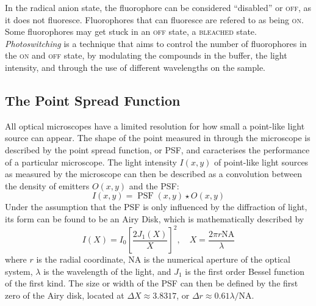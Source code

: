 In the radical anion state, the fluorophore can be considered \enquote{disabled} or \textsc{off}, as it does not fluoresce. Fluorophores that can fluoresce are refered to as being \textsc{on}. Some fluorophores may get stuck in an \textsc{off} state, a \textsc{bleached} state. \emph{Photoswitching} is a technique that aims to control the number of fluorophores in the \textsc{on} and \textsc{off} state, by modulating the compounds in the buffer, the light intensity, and through the use of different wavelengths on the sample. 


\subsection{The Point Spread Function} \label{sec:PSF}
All optical microscopes have a limited resolution for how small a point-like light source can appear. The shape of the point measured in through the microscope is described by the point spread function, or PSF, and caracterises the performance of a particular microscope. The light intensity $I(x, y)$ of point-like light sources as measured by the microscope can then be described as a convolution between the density of emitters $O(x, y)$ and the PSF:
\begin{equation}
    I(x, y) = \operatorname{PSF}(x, y) \star O(x, y)
\end{equation}
Under the assumption that the PSF is only influenced by the diffraction of light, its form can be found to be an Airy Disk, which is mathematically described by
\begin{equation}
    I(X) = I_0 \left[ \frac{2 J_1(X)}{X} \right]^{2}, \quad X = \frac{2\pi r \textrm{NA}}{\lambda}
\end{equation}
where $r$ is the radial coordinate, NA is the numerical aperture of the optical system, $\lambda$ is the wavelength of the light, and $J_1$ is the first order Bessel function of the first kind. The size or width of the PSF can then be defined by the first zero of the Airy disk, located at $\Delta X \approx 3.8317$, or $\Delta r \approx 0.61 \lambda / \textrm{NA}$.


